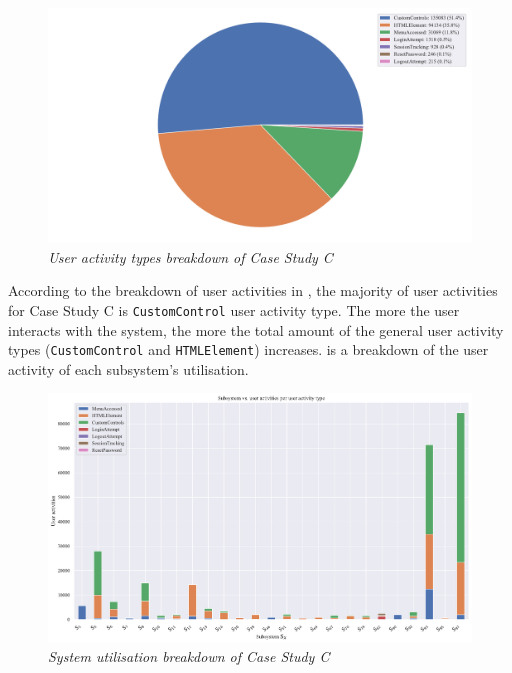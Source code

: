 \begin{figure}[!htb]
	\centering %
	\includegraphics[width=0.95\linewidth]{img/ch3/analysis/case_C_breakdown.pdf}
	\caption[User activity types breakdown of Case Study C]
	{\textit{User activity types breakdown of Case Study C}}\label{fig:ch3_caseCBreakdown}
\end{figure}

According to the breakdown of user activities in , the majority of user activities for Case Study C is \texttt{CustomControl} user activity type. The more the user interacts with the system, the more the total amount of the general user activity types (\texttt{CustomControl} and \texttt{HTMLElement}) increases.  is a breakdown of the user activity of each subsystem's utilisation.

\begin{figure}[!htb]
	\centering %
	\includegraphics[width=0.95\linewidth]{img/ch3/analysis/case_C_subsystems_1.pdf}
	\caption[System utilisation breakdown of Case Study C]
	{\textit{System utilisation breakdown of Case Study C}}\label{fig:ch3_caseCAnalysis}
\end{figure} 

